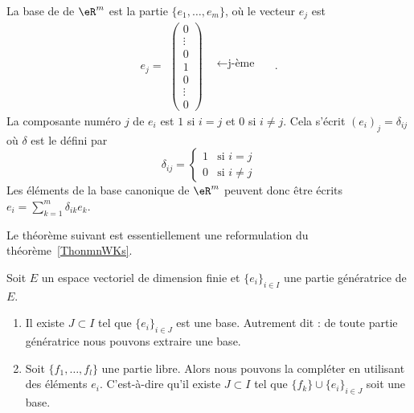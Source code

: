 \begin{example}
	La base de  de \( \eR^m\) est la partie $\{e_1,\ldots, e_m\}$, où le vecteur $e_j$ est
	\begin{equation}\nonumber
		e_j=
		\begin{array}{cc}
			\begin{pmatrix}
				0 \\\vdots\\0\\1\\ 0\\\vdots\\0
			\end{pmatrix} &
			\begin{matrix}
				\quad \\\quad\\\leftarrow\textrm{j-ème} \quad\\\quad\\\quad\\
			\end{matrix}
		\end{array}.
	\end{equation}
	La composante numéro $j$ de $e_i$ est $1$ si $i=j$ et $0$ si $i\neq j$. Cela s'écrit $(e_i)_j=\delta_{ij}$ où $\delta$ est le  défini par
	\begin{equation}
		\delta_{ij}=\begin{cases}
			1 & \text{si }i=j     \\
			0 & \text{si }i\neq j
		\end{cases}
	\end{equation}
	Les éléments de la base canonique de $\eR^m$ peuvent donc être écrits $e_i=\sum_{k=1}^m\delta_{ik}e_k$.
\end{example}

Le théorème suivant est essentiellement une reformulation du théorème~\ref{ThonmnWKs}.
\begin{theorem} \label{ThoMGQZooIgrXjy}
	Soit \( E\) un espace vectoriel de dimension finie et \( \{ e_i \}_{i\in I}\) une partie génératrice de \( E\).

	\begin{enumerate}
		\item       \label{ITEMooTZUDooFEgymQ}
		      Il existe \( J\subset I\) tel que \( \{ e_i \}_{i\in J}\) est une base. Autrement dit : de toute partie génératrice nous pouvons extraire une base.
		\item       \label{ITEMooCJQGooXwjsfm}
		      Soit \( \{ f_1,\ldots, f_l \}\) une partie libre. Alors nous pouvons la compléter en utilisant des éléments \( e_i\). C'est-à-dire qu'il existe \( J\subset I\) tel que \( \{ f_k \}\cup\{ e_i \}_{i\in J}\) soit une base.
	\end{enumerate}
\end{theorem}

